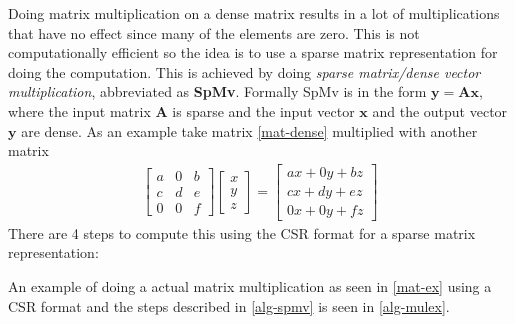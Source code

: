 Doing matrix multiplication on a dense matrix results in a lot of multiplications that have no effect since many of the elements are zero.
This is not computationally efficient so the idea is to use a sparse matrix representation for doing the computation.
This is achieved by doing \textit{sparse matrix/dense vector multiplication}, abbreviated as \textbf{SpMv}.
Formally SpMv is in the form $\mathbf{y=Ax}$, where the input matrix $\mathbf{A}$ is sparse and the input vector $\mathbf{x}$ and the output vector $\mathbf{y}$ are dense.
As an example take matrix \ref{mat-dense} multiplied with another matrix
\begin{gather}
	\begin{bmatrix}
		a & 0 & b \\[0.3em]
		c & d & e \\[0.3em]
		0 & 0 & f
	\end{bmatrix}
	\begin{bmatrix}
		x \\[0.3em]
		y \\[0.3em]
		z 
	\end{bmatrix}
	=
	\begin{bmatrix}
	ax + 0y + bz \\[0.3em]
	cx + dy + ez \\[0.3em]
	0x + 0y + fz
	\end{bmatrix}
	\label{mat-ex}
\end{gather}
There are 4 steps to compute this using the CSR format for a sparse matrix representation:
\begin{center}
	\label{alg-spmv}
\end{center}
An example of doing a actual matrix multiplication as seen in \autoref{mat-ex} using a CSR format and the steps described in \autoref{alg-spmv} is seen in \autoref{alg-mulex}.

